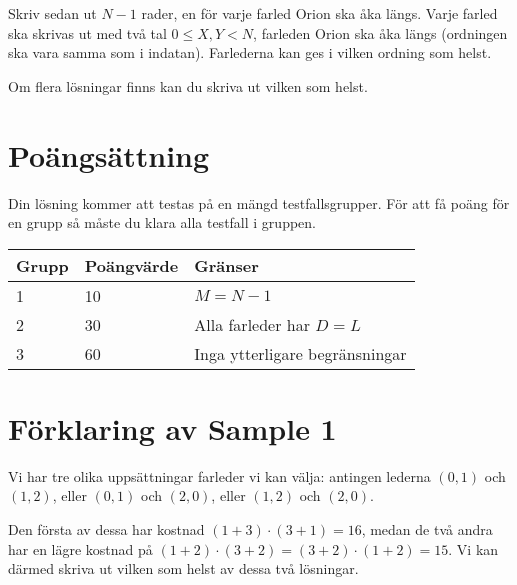 Skriv sedan ut $N - 1$ rader, en för varje farled Orion ska åka längs.
Varje farled ska skrivas ut med två tal $0 \le X, Y < N$, farleden Orion ska åka längs (ordningen ska vara samma som i indatan).
Farlederna kan ges i vilken ordning som helst.

Om flera lösningar finns kan du skriva ut vilken som helst.

\section*{Poängsättning}
Din lösning kommer att testas på en mängd testfallsgrupper. För att få poäng för en grupp så måste du klara alla testfall i gruppen.

\noindent
\begin{tabular}{| l | l | l |}
\hline
Grupp & Poängvärde & Gränser \\ \hline
1     & 10         & $M = N-1$ \\ \hline
2     & 30         & Alla farleder har $D = L$ \\ \hline
3     & 60         & Inga ytterligare begränsningar \\ \hline
\end{tabular}

\section*{Förklaring av Sample 1}
Vi har tre olika uppsättningar farleder vi kan välja: antingen lederna $(0, 1)$ och $(1, 2)$, eller $(0, 1)$ och $(2, 0)$, eller $(1, 2)$ och $(2, 0)$.

Den första av dessa har kostnad $(1 + 3) \cdot (3 + 1) = 16$, medan de två andra har en lägre kostnad på $(1 + 2) \cdot (3 + 2) = (3 + 2) \cdot (1 + 2) = 15$.
Vi kan därmed skriva ut vilken som helst av dessa två lösningar.
